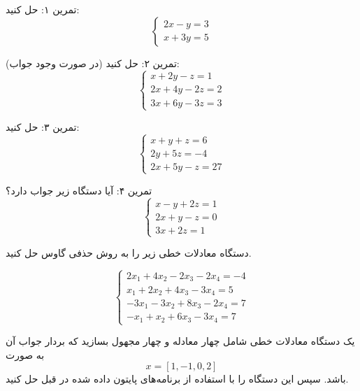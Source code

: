 \begin{exercise}
 تمرین ۱:
حل کنید:
\[
\begin{cases}
	2x - y = 3 \\
	x + 3y = 5
\end{cases}
\]

تمرین ۲:
حل کنید (در صورت وجود جواب):
\[
\begin{cases}
	x + 2y - z = 1 \\
	2x + 4y - 2z = 2 \\
	3x + 6y - 3z = 3
\end{cases}
\]

تمرین ۳:
حل کنید:
\[
\begin{cases}
	x + y + z = 6 \\
	2y + 5z = -4 \\
	2x + 5y - z = 27
\end{cases}
\]

تمرین ۴:
آیا دستگاه زیر جواب دارد؟
\[
\begin{cases}
	x - y + 2z = 1 \\
	2x + y - z = 0 \\
	3x + 2z = 1
\end{cases}
\]	
\end{exercise} 
\begin{exercise}
	دستگاه معادلات خطی زیر را به روش حذفی گاوس حل کنید.
	
	\[
	\begin{cases}
		2x_1 + 4x_2 - 2x_3 - 2x_4 = -4 \\
		x_1 + 2x_2 + 4x_3 - 3x_4 = 5 \\
		-3x_1 - 3x_2 + 8x_3 - 2x_4 = 7 \\
		-x_1 + x_2 + 6x_3 - 3x_4 = 7
	\end{cases}
	\]
	
\end{exercise}

\begin{code}
	\begin{latin}
		  
	\end{latin}
\end{code}

\begin{exercise}
	یک دستگاه معادلات خطی شامل چهار معادله و چهار مجهول بسازید که بردار جواب آن به صورت 
	$$x=[1,-1,0,2]$$
	باشد. سپس این دستگاه را با استفاده از برنامه‌های پایتون داده شده در قبل حل کنید.
\end{exercise}